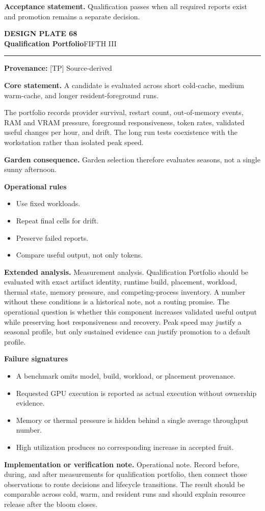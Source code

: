 \documentclass[10pt,letterpaper,oneside]{article}
\newcommand{\prov}[1]{\textcolor{gardenBlue}{\sffamily\footnotesize\textbf{Provenance:} #1}}
\newcommand{\platetitle}[3]{%
  \begin{minipage}[t][0.54in][t]{\textwidth}
  {\sffamily\bfseries\color{gardenDeep}\fontsize{9}{10}\selectfont DESIGN PLATE #1}\\[-1pt]
  {\sffamily\bfseries\color{gardenInk}\fontsize{16.5}{18}\selectfont #2}\hfill{\sffamily\color{gardenGreen}\large #3}
  \end{minipage}\vspace{-2pt}\hrule\vspace{5pt}}
\begin{document}
\begin{acceptbox}
\textbf{Acceptance statement.} Qualification passes when all required reports exist and promotion remains a separate decision.
\end{acceptbox}
\newpage
\platetitle{68}{Qualification Portfolio}{FIFTH III}
\prov{[TP] Source-derived}
\fontsize{8.85}{10.45}\selectfont
\begin{corebox}
\textbf{Core statement.} A candidate is evaluated across short cold-cache, medium warm-cache, and longer resident-foreground runs.
\end{corebox}
The portfolio records provider survival, restart count, out-of-memory events, RAM and VRAM pressure, foreground responsiveness, token rates, validated useful changes per hour, and drift. The long run tests coexistence with the workstation rather than isolated peak speed.

\textbf{Garden consequence.} Garden selection therefore evaluates seasons, not a single sunny afternoon.

\textbf{Operational rules}
\begin{itemize}
\item Use fixed workloads.
\item Repeat final cells for drift.
\item Preserve failed reports.
\item Compare useful output, not only tokens.
\end{itemize}
\textbf{Extended analysis.} Measurement analysis. Qualification Portfolio should be evaluated with exact artifact identity, runtime build, placement, workload, thermal state, memory pressure, and competing-process inventory. A number without these conditions is a historical note, not a routing promise. The operational question is whether this component increases validated useful output while preserving host responsiveness and recovery. Peak speed may justify a seasonal profile, but only sustained evidence can justify promotion to a default profile.

\textbf{Failure signatures}
\begin{itemize}
\item A benchmark omits model, build, workload, or placement provenance.
\item Requested GPU execution is reported as actual execution without ownership evidence.
\item Memory or thermal pressure is hidden behind a single average throughput number.
\item High utilization produces no corresponding increase in accepted fruit.
\end{itemize}
\textbf{Implementation or verification note.} Operational note. Record before, during, and after measurements for qualification portfolio, then connect those observations to route decisions and lifecycle transitions. The result should be comparable across cold, warm, and resident runs and should explain resource release after the bloom closes.
\end{document}
